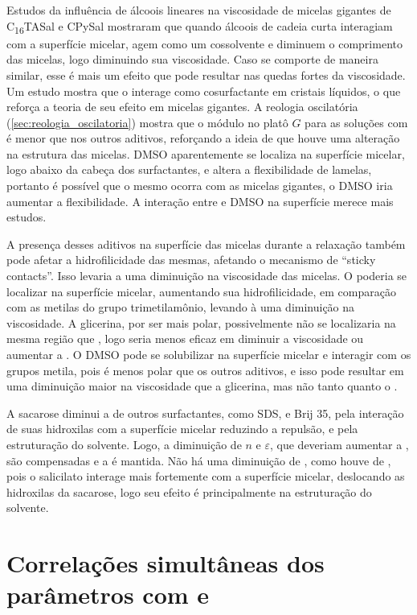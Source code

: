 		Estudos da influência de álcoois lineares na viscosidade de micelas gigantes de C\textsubscript{16}TASal e CPySal\cite{Bayer1986} mostraram que quando álcoois de cadeia curta interagiam com a superfície micelar, agem como um cossolvente e diminuem o comprimento das micelas, logo diminuindo sua viscosidade. Caso \BD{} se comporte de maneira similar, esse é mais um efeito que pode resultar nas quedas fortes da viscosidade. Um estudo mostra que o \BD{} interage como cosurfactante em cristais líquidos, o que reforça a teoria de seu efeito em micelas gigantes.\cite{Iwanaga1998a} A reologia oscilatória (\autoref{sec:reologia_oscilatoria}) mostra que o módulo no platô \(G\) para as soluções com \BD{} é menor que nos outros aditivos, reforçando a ideia de que houve uma alteração na estrutura das micelas. DMSO aparentemente se localiza na superfície micelar, logo abaixo da cabeça dos surfactantes, e altera a flexibilidade de lamelas,\cite{Notman2006} portanto é possível que o mesmo ocorra com as micelas gigantes, o DMSO iria aumentar a flexibilidade. A interação entre \Sal{} e DMSO na superfície merece mais estudos.
		
		A presença desses aditivos na superfície das micelas durante a relaxação também pode afetar a hidrofilicidade das mesmas, afetando o mecanismo de ``sticky contacts''. Isso levaria a uma diminuição na viscosidade das micelas. O \BD{} poderia se localizar na superfície micelar, aumentando sua hidrofilicidade, em comparação com as metilas do grupo trimetilamônio, levando à uma diminuição na viscosidade. A glicerina, por ser mais polar, possivelmente não se localizaria na mesma região que \BD, logo seria menos eficaz em diminuir a viscosidade ou aumentar a \cmc. O DMSO pode se solubilizar na superfície micelar e interagir com os grupos metila, pois é menos polar que os outros aditivos, e isso pode resultar em uma diminuição maior na viscosidade que a glicerina, mas não tanto quanto o \BD{}. 
		
		A sacarose diminui a \cmc{} de outros surfactantes, como SDS, \CTAB{} e Brij 35, pela interação de suas hidroxilas com a superfície micelar reduzindo a repulsão, e pela estruturação do solvente. Logo, a diminuição de \(n\) e \(\varepsilon\), que deveriam aumentar a \cwlm{}, são compensadas e a \cwlm{} é mantida. Não há uma diminuição de \cwlm, como houve de \cmc, pois o salicilato interage mais fortemente com a superfície micelar, deslocando as hidroxilas da sacarose, logo seu efeito é principalmente na estruturação do solvente.
		
		\section{Correlações simultâneas dos parâmetros com \cmc{} e \DHmic}
		\label{sec:correlacao_params_cmc_dh}
		
